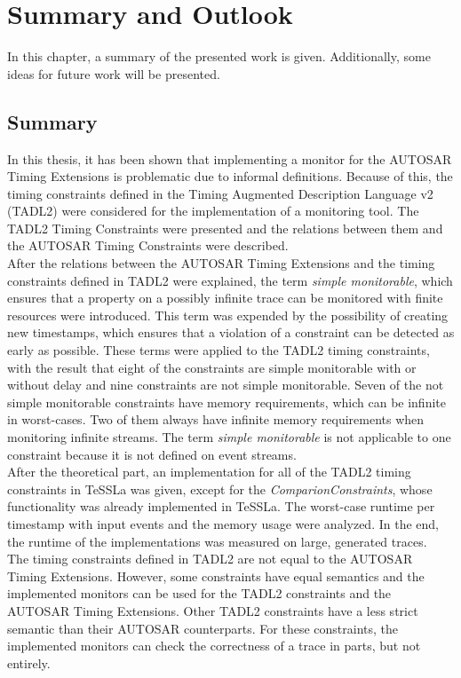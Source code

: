 
\chapter{Summary and Outlook}
\label{chapter-fazit}

In this chapter, a summary of the presented work is given. Additionally, some ideas for future work will be presented.
\section{Summary}
	In this thesis, it has been shown that implementing a monitor for the AUTOSAR Timing Extensions is problematic due to informal definitions. Because of this, the timing constraints defined in the Timing Augmented Description Language v2 (TADL2) were considered for the implementation of a monitoring tool. The TADL2 Timing Constraints were presented and the relations between them and the AUTOSAR Timing Constraints were described.\\
	After the relations between the AUTOSAR Timing Extensions and the timing constraints defined in TADL2 were explained, the term \textit{simple monitorable}, which ensures that a property on a possibly infinite trace can be monitored with finite resources were introduced. This term was expended by the possibility of creating new timestamps, which ensures that a violation of a constraint can be detected as early as possible. These terms were applied to the TADL2 timing constraints, with the result that eight of the constraints are simple monitorable with or without delay and nine constraints are not simple monitorable. Seven of the not simple monitorable constraints have memory requirements, which can be infinite in worst-cases. Two of them always have infinite memory requirements when monitoring infinite streams. The term \textit{simple monitorable} is not applicable to one constraint because it is not defined on event streams.\\
	After the theoretical part, an implementation for all of the TADL2 timing constraints in TeSSLa was given, except for the \textit{ComparionConstraints}, whose functionality was already implemented in TeSSLa. The worst-case runtime per timestamp with input events and the memory usage were analyzed. In the end, the runtime of the implementations was measured on large, generated traces.\\
	The timing constraints defined in TADL2 are not equal to the AUTOSAR Timing Extensions. However, some constraints have equal semantics and the implemented monitors can be used for the TADL2 constraints and the AUTOSAR Timing Extensions. Other TADL2 constraints have a less strict semantic than their AUTOSAR counterparts. For these constraints, the implemented monitors can check the correctness of a trace in parts, but not entirely.\\
